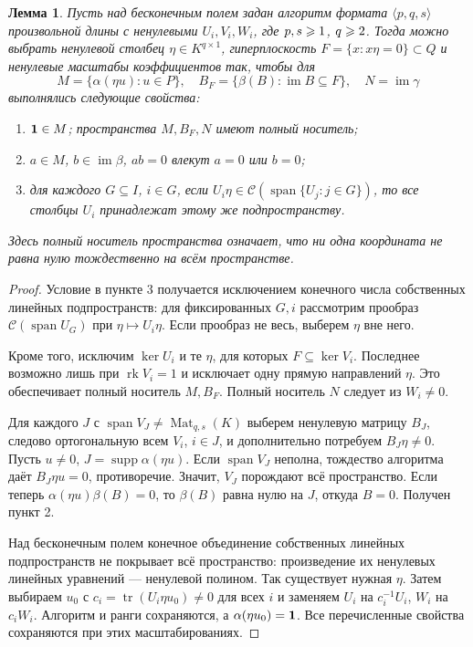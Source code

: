 \documentclass[11pt,a4paper]{article}
\numberwithin{equation}{section}
\theoremstyle{plain}
\newtheorem{lemma}[theorem]{Лемма}
\theoremstyle{definition}
\DeclareMathOperator{\tr}{tr}\DeclareMathOperator{\rk}{rk}
\DeclareMathOperator{\im}{im}\DeclareMathOperator{\supp}{supp}
\DeclareMathOperator{\Mat}{Mat}\DeclareMathOperator{\Span}{span}
\newcommand{\col}{\mathcal C}\newcommand{\test}{\mathcal T}
\begin{document}
\begin{lemma}\label{lem:generic}
Пусть над бесконечным полем задан алгоритм формата $\langle p,q,s\rangle$
произвольной длины с ненулевыми $U_i,V_i,W_i$, где $p,s\geqslant1$, $q\geqslant2$.
Тогда можно выбрать ненулевой столбец $\eta\in K^{q\times1}$, гиперплоскость
$F=\{x:x\eta=0\}\subset Q$ и ненулевые масштабы коэффициентов так,
чтобы для
\[
 M=\{\alpha(\eta u):u\in P\},\quad
 B_F=\{\beta(B):\im B\subseteq F\},\quad N=\im\gamma
\]
выполнялись следующие свойства:
\begin{enumerate}
\item $\mathbf1\in M$; пространства $M,B_F,N$ имеют полный носитель;
\item $a\in M$, $b\in\im\beta$, $ab=0$ влекут $a=0$ или $b=0$;
\item для каждого $G\subseteq I$, $i\in G$, если
$U_i\eta\in\col(\Span\{U_j:j\in G\})$, то все столбцы $U_i$
принадлежат этому же подпространству.
\end{enumerate}
Здесь полный носитель пространства означает, что ни одна координата
не равна нулю тождественно на всём пространстве.
\end{lemma}
\begin{proof}
Условие в пункте 3 получается исключением конечного числа собственных
линейных подпространств: для фиксированных $G,i$ рассмотрим прообраз
$\col(\Span U_G)$ при $\eta\mapsto U_i\eta$. Если прообраз не весь,
выберем $\eta$ вне него.

Кроме того, исключим $\ker U_i$ и те $\eta$, для которых $F\subseteq\ker V_i$.
Последнее возможно лишь при $\rk V_i=1$ и исключает одну прямую
направлений $\eta$. Это обеспечивает полный носитель $M,B_F$.
Полный носитель $N$ следует из $W_i\ne0$.

Для каждого $J$ с $\Span V_J\ne\Mat_{q,s}(K)$ выберем ненулевую
матрицу $B_J$, следово ортогональную всем $V_i$, $i\in J$,
и дополнительно потребуем $B_J\eta\ne0$.
Пусть $u\ne0$, $J=\supp\alpha(\eta u)$. Если $\Span V_J$ неполна,
тождество алгоритма даёт $B_J\eta u=0$, противоречие.
Значит, $V_J$ порождают всё пространство. Если теперь
$\alpha(\eta u)\beta(B)=0$, то $\beta(B)$ равна нулю на $J$,
откуда $B=0$. Получен пункт 2.

Над бесконечным полем конечное объединение собственных линейных
подпространств не покрывает всё пространство: произведение их ненулевых
линейных уравнений --- ненулевой полином. Так существует нужная $\eta$.
Затем выбираем $u_0$ с $c_i=\tr(U_i\eta u_0)\ne0$ для всех $i$ и заменяем
$U_i$ на $c_i^{-1}U_i$, $W_i$ на $c_iW_i$. Алгоритм и ранги сохраняются,
а $\alpha(\eta u_0)=\mathbf1$. Все перечисленные свойства сохраняются при
этих масштабированиях.
\end{proof}
\end{document}
